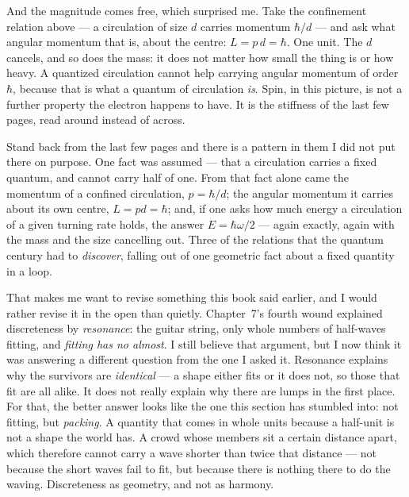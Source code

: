 \documentclass[fontsize=11pt,paper=a4,pagesize=auto,parskip=half-]{scrbook}
\begin{document}
And the magnitude comes free, which surprised me. Take the confinement relation above --- a circulation of size $d$ carries momentum $\hbar/d$ --- and ask what angular momentum that is, about the centre: $L = p\,d = \hbar$. One unit. The $d$ cancels, and so does the mass: it does not matter how small the thing is or how heavy. A quantized circulation cannot help carrying angular momentum of order $\hbar$, because that is what a quantum of circulation \emph{is}. Spin, in this picture, is not a further property the electron happens to have. It is the stiffness of the last few pages, read around instead of across.

Stand back from the last few pages and there is a pattern in them I did not put there on purpose. One fact was assumed --- that a circulation carries a fixed quantum, and cannot carry half of one. From that fact alone came the momentum of a confined circulation, $p = \hbar/d$; the angular momentum it carries about its own centre, $L = pd = \hbar$; and, if one asks how much energy a circulation of a given turning rate holds, the answer $E = \hbar\omega/2$ --- again exactly, again with the mass and the size cancelling out. Three of the relations that the quantum century had to \emph{discover}, falling out of one geometric fact about a fixed quantity in a loop.

That makes me want to revise something this book said earlier, and I would rather revise it in the open than quietly. Chapter~7's fourth wound explained discreteness by \emph{resonance}: the guitar string, only whole numbers of half-waves fitting, and \emph{fitting has no almost}. I still believe that argument, but I now think it was answering a different question from the one I asked it. Resonance explains why the survivors are \emph{identical} --- a shape either fits or it does not, so those that fit are all alike. It does not really explain why there are lumps in the first place. For that, the better answer looks like the one this section has stumbled into: not fitting, but \emph{packing}. A quantity that comes in whole units because a half-unit is not a shape the world has. A crowd whose members sit a certain distance apart, which therefore cannot carry a wave shorter than twice that distance --- not because the short waves fail to fit, but because there is nothing there to do the waving. Discreteness as geometry, and not as harmony.
\end{document}
